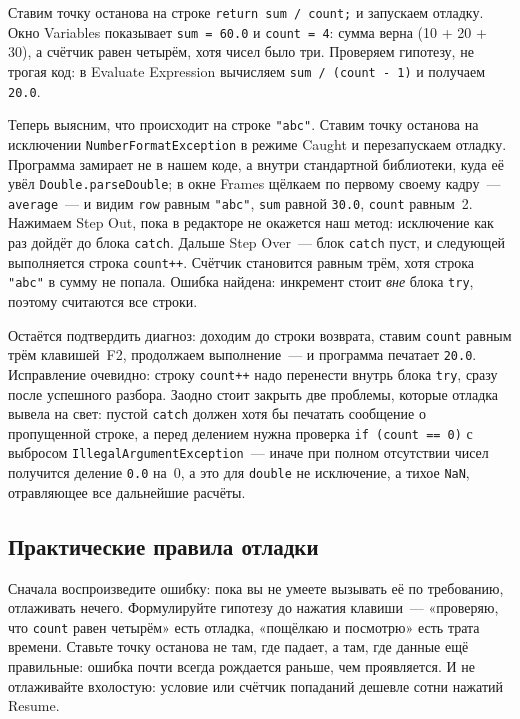 Ставим точку останова на строке \texttt{return sum / count;} и запускаем
отладку. Окно Variables показывает \texttt{sum = 60.0} и \texttt{count = 4}:
сумма верна (10 + 20 + 30), а счётчик равен четырём, хотя чисел было три.
Проверяем гипотезу, не трогая код: в Evaluate Expression вычисляем
\texttt{sum / (count - 1)} и получаем \texttt{20.0}.

Теперь выясним, что происходит на строке \texttt{"abc"}. Ставим точку останова
на исключении \texttt{NumberFormatException} в режиме Caught и перезапускаем
отладку. Программа замирает не в нашем коде, а внутри стандартной библиотеки,
куда её увёл \texttt{Double.parseDouble}; в окне Frames щёлкаем по первому
своему кадру~--- \texttt{average}~--- и видим \texttt{row} равным
\texttt{"abc"}, \texttt{sum} равной \texttt{30.0}, \texttt{count} равным~2.
Нажимаем Step Out, пока в редакторе не окажется наш метод: исключение как раз
дойдёт до блока \texttt{catch}. Дальше Step Over~--- блок \texttt{catch} пуст, и
следующей выполняется строка \texttt{count++}. Счётчик становится равным трём,
хотя строка \texttt{"abc"} в сумму не попала. Ошибка найдена: инкремент стоит
\emph{вне} блока \texttt{try}, поэтому считаются все строки.

Остаётся подтвердить диагноз: доходим до строки возврата, ставим \texttt{count}
равным трём клавишей~F2, продолжаем выполнение~--- и программа печатает
\texttt{20.0}. Исправление очевидно: строку \texttt{count++} надо перенести
внутрь блока \texttt{try}, сразу после успешного разбора. Заодно стоит закрыть
две проблемы, которые отладка вывела на свет: пустой \texttt{catch} должен хотя
бы печатать сообщение о пропущенной строке, а перед делением нужна проверка
\texttt{if (count == 0)} с выбросом \texttt{IllegalArgumentException}~--- иначе
при полном отсутствии чисел получится деление \texttt{0.0} на~0, а это для
\texttt{double} не исключение, а тихое \texttt{NaN}, отравляющее все дальнейшие
расчёты.

\subsection{Практические правила отладки}

Сначала воспроизведите ошибку: пока вы не умеете вызывать её по требованию,
отлаживать нечего. Формулируйте гипотезу до нажатия клавиши~--- «проверяю, что
\texttt{count} равен четырём» есть отладка, «пощёлкаю и посмотрю» есть трата
времени. Ставьте точку останова не там, где падает, а там, где данные ещё
правильные: ошибка почти всегда рождается раньше, чем проявляется. И не
отлаживайте вхолостую: условие или счётчик попаданий дешевле сотни нажатий
Resume.

